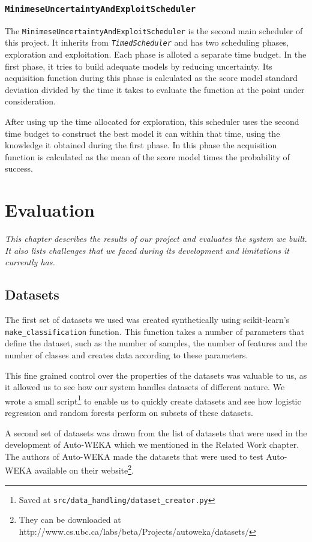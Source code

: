 \documentclass[a4paper,12pt,twoside,openright]{report}
\begin{document}
\subsection{\texttt{MinimeseUncertaintyAndExploitScheduler}}
The \texttt{MinimeseUncertaintyAndExploitScheduler} is the second main scheduler of this project. It inherits from \texttt{\textit{TimedScheduler}} and has two scheduling phases, exploration and exploitation. Each phase is alloted a separate time budget. In the first phase, it tries to build adequate models by reducing uncertainty. Its acquisition function during this phase is calculated as the score model standard deviation divided by the time it takes to evaluate the function at the point under consideration.

After using up the time allocated for exploration, this scheduler uses the second time budget to construct the best model it can within that time, using the knowledge it obtained during the first phase. In this phase the acquisition function is calculated as the mean of the score model times the probability of success.


\chapter{Evaluation}

\textit{This chapter describes the results of our project and evaluates the system we built. It also lists challenges that we faced during its development and limitations it currently has.}

\section{Datasets}
The first set of datasets we used was created synthetically using scikit-learn's \texttt{make\_classification} function. This function takes a number of parameters that define the dataset, such as the number of samples, the number of features and the number of classes and creates data according to these parameters. 

This fine grained control over the properties of the datasets was valuable to us, as it allowed us to see how our system handles datasets of different nature. We wrote a small script\footnote{Saved at \texttt{src/data\_handling/dataset\_creator.py}} to enable us to quickly create datasets and see how logistic regression and random forests perform on subsets of these datasets.


A second set of datasets was drawn from the list of datasets that were used in the development of Auto-WEKA which we mentioned in the Related Work chapter. The authors of Auto-WEKA made the datasets that were used to test Auto-WEKA available on their website\footnote{They can be downloaded at http://www.cs.ubc.ca/labs/beta/Projects/autoweka/datasets/}.
\end{document}
